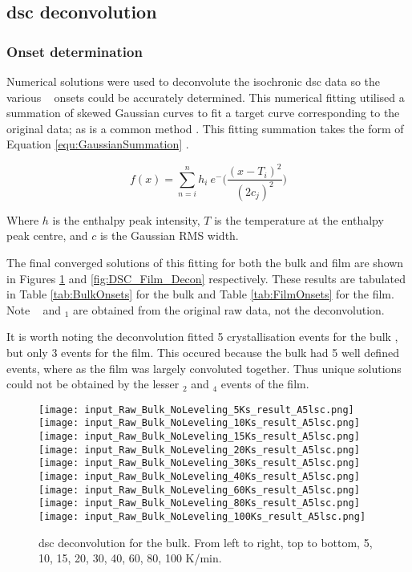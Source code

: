 \documentclass[a4paper,12pt,oneside]{article}%
\begin{document}
\subsection{\acrshort{dsc} deconvolution}

\subsubsection{Onset determination}

Numerical 
solutions were used to deconvolute the isochronic \acrshort{dsc} data so the various \Tx~ onsets could be accurately determined. This numerical fitting utilised a summation of skewed Gaussian curves to fit a target curve corresponding to the original data; as is a common method \cite{Ashour2010, Yamamoto2007, Spink2008, Spink2015, Schaffer2005}. This fitting summation takes the form of Equation \ref{equ:GaussianSummation} .

\begin{equation}
	f(x) = \sum_{n=i}^{n} h_{i}~ e^-{\bigg(\frac{(x-T_{i})^2}{(2c_{j})^2}\bigg)}
	\label{equ:GaussianSummation}
\end{equation}

Where $h$ is the enthalpy peak intensity, $T$ is the temperature at the enthalpy peak centre, and $c$ is the Gaussian RMS width.

The final converged solutions of this fitting for both the bulk and film are shown in Figures \ref{fig:DSC_Bulk_Decon} and \ref{fig:DSC_Film_Decon} respectively. These results are tabulated in Table \ref{tab:BulkOnsets} for the bulk and Table \ref{tab:FilmOnsets} for the film. Note \Tg~ and \Tx$_{1}$ are obtained from the original raw data, not the deconvolution.

It is worth noting the deconvolution fitted 5 crystallisation events for the bulk \MgZnCa, but only 3 events for the film. This occured because the bulk had 5 well defined events, where as the film was largely convoluted together. Thus unique solutions could not be obtained by the lesser \Tx$_{2}$ and \Tx$_{4}$ events of the film. 

\begin{figure}[b]
	\centering
	\texttt{[image: input\_Raw\_Bulk\_NoLeveling\_5Ks\_result\_A5lsc.png]}\quad
	\texttt{[image: input\_Raw\_Bulk\_NoLeveling\_10Ks\_result\_A5lsc.png]}\quad
	\texttt{[image: input\_Raw\_Bulk\_NoLeveling\_15Ks\_result\_A5lsc.png]}
	\medskip
	\texttt{[image: input\_Raw\_Bulk\_NoLeveling\_20Ks\_result\_A5lsc.png]}\quad
	\texttt{[image: input\_Raw\_Bulk\_NoLeveling\_30Ks\_result\_A5lsc.png]}\quad
	\texttt{[image: input\_Raw\_Bulk\_NoLeveling\_40Ks\_result\_A5lsc.png]}
	\medskip
	\texttt{[image: input\_Raw\_Bulk\_NoLeveling\_60Ks\_result\_A5lsc.png]}\quad
	\texttt{[image: input\_Raw\_Bulk\_NoLeveling\_80Ks\_result\_A5lsc.png]}\quad
	\texttt{[image: input\_Raw\_Bulk\_NoLeveling\_100Ks\_result\_A5lsc.png]}
	\caption{\acrshort{dsc} deconvolution for the bulk. From left to right, top to bottom, 5, 10, 15, 20, 30, 40, 60, 80, 100 K/min.}
	\label{fig:DSC_Bulk_Decon}
\end{figure}
\end{document}
